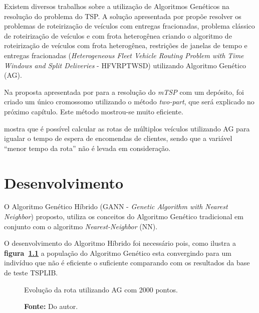 \documentclass[12pt,openright,a4paper,twoside]{tcc}
\begin{document}
			Existem diversos trabalhos sobre a utilização de Algoritmos Genéticos na resolução do problema do TSP. A solução apresentada por  propõe resolver os problemas de roteirização de 
			veículos com entregas fracionadas, problema clássico de roteirização de veículos e com 
			frota heterogênea criando o algoritmo de roteirização de veículos com frota heterogênea, 
			restrições de janelas de tempo e entregas fracionadas (\textit{Heterogeneous Fleet Vehicle 
			Routing Problem with Time Windows and Split Deliveries} - HFVRPTWSD) utilizando Algoritmo 
			Genético (AG).

			Na proposta  apresentada por  para a resolução do \textit{mTSP} com um depósito, foi criado um único cromossomo utilizando o método \textit{two-part}, que será explicado no próximo capítulo. Este método mostrou-se muito eficiente.

			  mostra que é possível calcular as rotas de múltiplos veículos utilizando AG para igualar o tempo 
			de espera de encomendas de clientes, sendo que a variável ``menor tempo da rota'' não é levada em consideração.

		
		\chapter{Desenvolvimento}
		
		O Algoritmo Genético Híbrido (GANN - \textit{Genetic Algorithm with Nearest Neighbor}) proposto, utiliza os conceitos do Algoritmo Genético tradicional em conjunto com o algoritmo  \textit{Nearest-Neighbor} (NN).

		O desenvolvimento do Algoritmo Híbrido foi necessário pois, como ilustra a \textbf{figura~\ref{graf-agestag}}  a população do Algoritmo Genético esta convergindo para um indivíduo que não é eficiente o suficiente comparando com os resultados da base de teste TSPLIB.  

		\begin{figure}[h]
			\centering
            \caption{Evolução da rota utilizando AG com 2000 pontos.}
            \caption*{\textbf{Fonte:} Do autor.}
			\label{graf-agestag}
		\end{figure}
\end{document}
